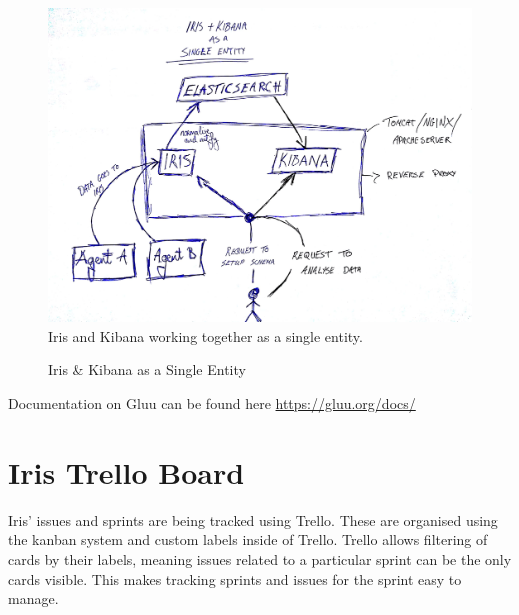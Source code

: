 \documentclass[12pt,a4paper,titlepage]{report}
\begin{document}
\begin{appendices}
\begin{figure}[H]
\begin{tcolorbox}
\includegraphics[width=\textwidth,height=\textheight,keepaspectratio]{iris_kibana_single_entity}
\newline
Iris and Kibana working together as a single entity.
\end{tcolorbox}
\caption{Iris \& Kibana as a Single Entity}
\end{figure}
Documentation on Gluu can be found here \url{https://gluu.org/docs/}

\chapter{Iris Trello Board}
Iris’ issues and sprints are being tracked using Trello. These are organised using the kanban system and custom labels inside of Trello. Trello allows filtering of cards by their labels, meaning issues related to a particular sprint can be the only cards visible. This makes tracking sprints and issues for the sprint easy to manage.


\end{appendices}
\end{document}
